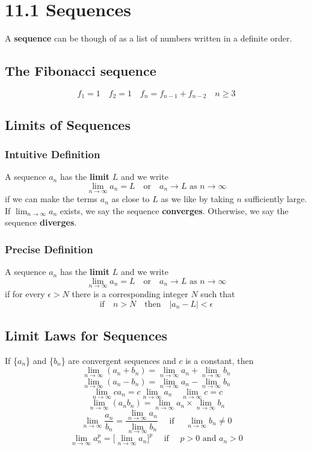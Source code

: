 %
%

\section*{11.1 Sequences}

A \textbf{sequence} can be though of as a list of numbers written in a definite order. 

\subsection*{The Fibonacci sequence}

\[ f_1 = 1 \quad f_2 = 1 \quad f_n = f_{n-1} + f_{n-2} \quad n \geq 3 \]

\subsection*{Limits of Sequences}

\subsubsection*{Intuitive Definition}

A sequence \({a_n}\) has the \textbf{limit} \(L\) and we write
\[ \lim_{n \to \infty}{a_n = L} \quad \text{or} \quad a_n \to L \text{ as } n \to \infty \]
if we can make the terms \(a_n\) as close to \(L\) as we like by taking \(n\) sufficiently large. If \(\lim_{n \to \infty} a_n\) exists, we say the sequence \textbf{converges}. Otherwise, we say the sequence \textbf{diverges}.

\subsubsection*{Precise Definition}

A sequence \({a_n}\) has the \textbf{limit} \(L\) and we write
\[\lim_{n \to \infty}{a_n = L} \quad \text{or} \quad a_n \to L \text{ as } n \to \infty \]
if for every \( \epsilon > N \) there is a corresponding integer \(N\) such that 
\[ \text{if} \quad n > N \quad \text{then} \quad |a_n - L| < \epsilon \]

\subsection*{Limit Laws for Sequences}

If \{\(a_n\)\} and \{\(b_n\)\} are convergent sequences and \(c\) is a constant, then
\[ \lim_{n \to \infty}{(a_n + b_n)} = \lim_{n \to \infty}{a_n} + \lim_{n \to \infty}{b_n} \]
\[ \lim_{n \to \infty}{(a_n - b_n)} = \lim_{n \to \infty}{a_n} - \lim_{n \to \infty}{b_n} \]
\[ \lim_{n \to \infty}{c a_n} = c \lim_{n \to \infty}{a_n} \quad \lim_{n \to \infty}{c} = c \]
\[ \lim_{n \to \infty}{(a_n b_n)} = \lim_{n \to \infty}{a_n} \times \lim_{n \to \infty}{b_n} \]
\[ \lim_{n \to \infty}{\frac{a_n}{b_n}} = \frac{\lim_{n \to \infty}{a_n}}{\lim_{n \to \infty}{b_n}} \quad \text{ if } \quad \lim_{n \to \infty}{b_n \neq 0} \]
\[ \lim_{n \to \infty}{a_n^p} = \Big[\lim_{n \to \infty}{a_n} \Big]^p \quad \text{ if } \quad p > 0 \text{ and } a_n > 0 \]

